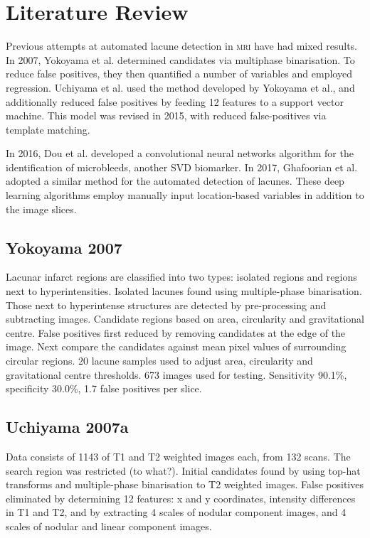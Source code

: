 %
%

\chapter{Literature Review}\label{litrev-intro}

Previous attempts at automated lacune detection in \textsc{mri} have had mixed results. In 2007, Yokoyama et al. \cite{Yokoyama2007} determined candidates via multiphase binarisation. To reduce false positives, they then quantified a number of variables and employed regression. Uchiyama et al. \cite{Uchiyama20071554} used the method developed by Yokoyama et al., and additionally reduced false positives by feeding 12 features to a support vector machine. This model was revised in 2015\cite{Uchiyama2015}, with reduced false-positives via template matching.

In 2016, Dou et al. \cite{DouQ.2016ADoC} developed a convolutional neural networks algorithm for the identification of microbleeds, another SVD biomarker. In 2017, Ghafoorian et al. \cite{GhafoorianM.2017Dml3} adopted a similar method for the automated detection of lacunes. These deep learning algorithms employ manually input location-based variables in addition to the image slices.

\section{Yokoyama 2007}

Lacunar infarct regions are classified into two types: isolated regions and regions next to hyperintensities. Isolated lacunes found using multiple-phase binarisation. Those next to hyperintense structures are detected by pre-processing and subtracting images. Candidate regions based on area, circularity and gravitational centre. False positives first reduced by removing candidates at the edge of the image. Next compare the candidates against mean pixel values of surrounding circular regions.
20 lacune samples used to adjust area, circularity and gravitational centre thresholds. 673 images used for testing. Sensitivity 90.1\%, specificity 30.0\%, 1.7 false positives per slice.

\section{Uchiyama 2007a}

Data consists of 1143 of T1 and T2 weighted images each, from 132 scans. The search region was restricted (to what?). Initial candidates found by using top-hat transforms and multiple-phase binarisation to T2 weighted images. False positives eliminated by determining 12 features: x and y coordinates, intensity differences in T1 and T2, and by extracting 4 scales of nodular component images, and 4 scales of nodular and linear component images.

